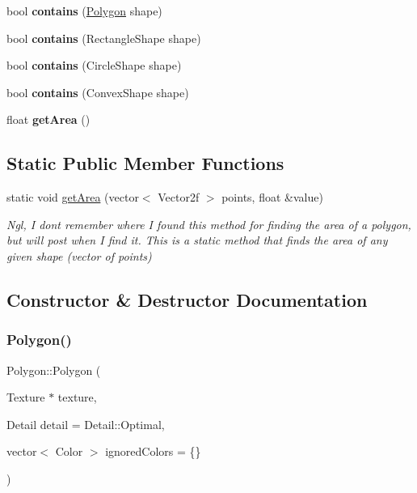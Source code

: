 \begin{DoxyCompactItemize}
\item 
\mbox{\label{class_polygon_a1501a824c6d97ce3ef8efc5443ab1f8e}} 
bool {\bfseries contains} (\mbox{\hyperlink{class_polygon}{Polygon}} shape)
\item 
\mbox{\label{class_polygon_a1712cd82ff38472dd9ba87f0f8b37a9f}} 
bool {\bfseries contains} (Rectangle\+Shape shape)
\item 
\mbox{\label{class_polygon_a60fe86ef61eeb9903a8eef32870ea1c4}} 
bool {\bfseries contains} (Circle\+Shape shape)
\item 
\mbox{\label{class_polygon_aea5d69a1006a0b6b08dbc3e236b302ea}} 
bool {\bfseries contains} (Convex\+Shape shape)
\item 
\mbox{\label{class_polygon_a00dc79655e7be6b73a83414a6733ec9a}} 
float {\bfseries get\+Area} ()
\end{DoxyCompactItemize}
\subsection*{Static Public Member Functions}
\begin{DoxyCompactItemize}
\item 
static void \mbox{\hyperlink{class_polygon_a21a607cdb559f8e4a98fa54d0b9d63a9}{get\+Area}} (vector$<$ Vector2f $>$ points, float \&value)
\begin{DoxyCompactList}\small\item\em Ngl, I don\textquotesingle{}t remember where I found this method for finding the area of a polygon, but will post when I find it. This is a static method that finds the area of any given shape (vector of points) \end{DoxyCompactList}\end{DoxyCompactItemize}


\subsection{Constructor \& Destructor Documentation}
\mbox{\label{class_polygon_a55f28f7bcae8df65ea11b99ff192b7d7}} 
\subsubsection{\texorpdfstring{Polygon()}{Polygon()}}
{\footnotesize\ttfamily Polygon\+::\+Polygon (\begin{DoxyParamCaption}\item[{Texture $\ast$}]{texture,  }\item[{Detail}]{detail = {\ttfamily Detail\+:\+:Optimal},  }\item[{vector$<$ Color $>$}]{ignored\+Colors = {\ttfamily \{\}} }\end{DoxyParamCaption})}


